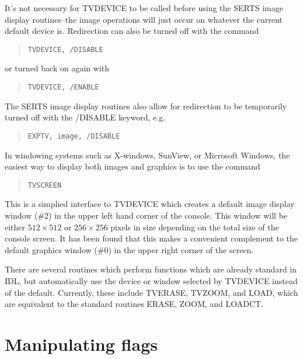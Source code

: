 It's not necessary for TVDEVICE to be called before using the SERTS image
display routines--the image operations will just occur on whatever the current
default device is.  Redirection can also be turned off with the command
\begin{quote}
\begin{verbatim}
TVDEVICE, /DISABLE
\end{verbatim}
\end{quote}
or turned back on again with
\begin{quote}
\begin{verbatim}
TVDEVICE, /ENABLE
\end{verbatim}
\end{quote}
The SERTS image display routines also allow for redirection to be temporarily
turned off with the /DISABLE keyword, e.g.
\begin{quote}
\begin{verbatim}
EXPTV, image, /DISABLE
\end{verbatim}
\end{quote}

In windowing systems such as X-windows, SunView, or Microsoft Windows, the
easiest way to display both images and graphics is to use the command
\begin{quote}
\begin{verbatim}
TVSCREEN
\end{verbatim}
\end{quote}
This is a simplied interface to TVDEVICE which creates a default image display
window (\#2) in the upper left hand corner of the console.  This window will be
either \mbox{$512 \times 512$} or \mbox{$256 \times 256$} pixels in size
depending on the total size of the console screen.  It has been found that this
makes a convenient complement to the default graphics window (\#0) in the upper
right corner of the screen.

There are several routines which perform functions which are already standard
in IDL, but automatically use the device or window selected by TVDEVICE instead
of the default.  Currently, these include TVERASE, TVZOOM, and LOAD, which are
equivalent to the standard routines ERASE, ZOOM, and LOADCT.

\section{Manipulating flags}
\label{flags}

